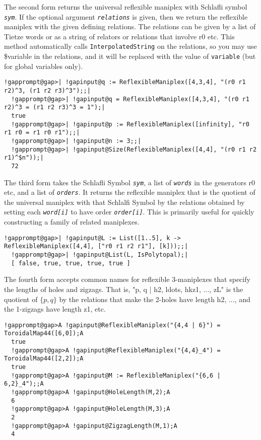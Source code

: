 \documentclass[a4paper,11pt]{report}
\begin{document}
{{{ The second form returns the universal reflexible maniplex with Schlafli symbol \mbox{\texttt{\mdseries\slshape sym}}. If the optional argument \mbox{\texttt{\mdseries\slshape relations}} is given, then we return the reflexible maniplex with the given defining
relations. The relations can be given by a list of Tietze words or as a string
of relators or relations that involve r0 etc. This method automatically calls \texttt{InterpolatedString} on the relations, so you may use \$variable in the relations, and it will be
replaced with the value of \texttt{variable} (but for global variables only). 
\begin{Verbatim}[commandchars=!@|,fontsize=\small,frame=single,label=Example]
  !gapprompt@gap>| !gapinput@q := ReflexibleManiplex([4,3,4], "(r0 r1 r2)^3, (r1 r2 r3)^3");;|
  !gapprompt@gap>| !gapinput@q = ReflexibleManiplex([4,3,4], "(r0 r1 r2)^3 = (r1 r2 r3)^3 = 1");|
  true
  !gapprompt@gap>| !gapinput@p := ReflexibleManiplex([infinity], "r0 r1 r0 = r1 r0 r1");;|
  !gapprompt@gap>| !gapinput@n := 3;;|
  !gapprompt@gap>| !gapinput@Size(ReflexibleManiplex([4,4], "(r0 r1 r2 r1)^$n"));|
  72
\end{Verbatim}
 The third form takes the Schlafli Symbol \mbox{\texttt{\mdseries\slshape sym}}, a list of \mbox{\texttt{\mdseries\slshape words}} in the generators r0 etc, and a list of \mbox{\texttt{\mdseries\slshape orders}}. It returns the reflexible maniplex that is the quotient of the universal
maniplex with that Schlalfi Symbol by the relations obtained by setting each \mbox{\texttt{\mdseries\slshape word[i]}} to have order \mbox{\texttt{\mdseries\slshape order[i]}}. This is primarily useful for quickly constructing a family of related
maniplexes. 
\begin{Verbatim}[commandchars=!@|,fontsize=\small,frame=single,label=Example]
  !gapprompt@gap>| !gapinput@L := List([1..5], k -> ReflexibleManiplex([4,4], ["r0 r1 r2 r1"], [k]));;|
  !gapprompt@gap>| !gapinput@List(L, IsPolytopal);|
  [ false, true, true, true, true ]
\end{Verbatim}
 

 The fourth form accepts common names for reflexible 3-maniplexes that specify
the lengths of holes and zigzags. That is, "\texttt{}p, q | h2,
\texttt{}ldots,
hk\texttt{}\texttt{}{\textunderscore}z1, ..., zL" is
the quotient of $\{p,q\}$ by the relations that make the 2-holes have length h2, ..., and the 1-zigzags
have length z1, etc. 
\begin{Verbatim}[commandchars=!@A,fontsize=\small,frame=single,label=Example]
  !gapprompt@gap>A !gapinput@ReflexibleManiplex("{4,4 | 6}") = ToroidalMap44([6,0]);A
  true
  !gapprompt@gap>A !gapinput@ReflexibleManiplex("{4,4}_4") = ToroidalMap44([2,2]);A
  true
  !gapprompt@gap>A !gapinput@M := ReflexibleManiplex("{6,6 | 6,2}_4");;A
  !gapprompt@gap>A !gapinput@HoleLength(M,2);A
  6
  !gapprompt@gap>A !gapinput@HoleLength(M,3);A
  2
  !gapprompt@gap>A !gapinput@ZigzagLength(M,1);A
  4
\end{Verbatim}
 }

}}
\end{document}
